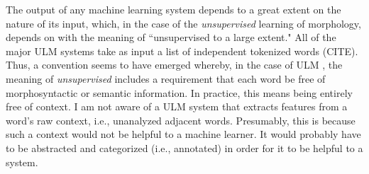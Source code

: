 The output of any machine learning system depends to 
a great extent on the nature of its input, which, in the case of the 
\emph{unsupervised} learning of morphology, 
depends on with the meaning of ``unsupervised to a large extent." 
All of the major \ac{ULM}  
systems take as input a list of independent tokenized words (CITE).
Thus, a convention seems to have emerged whereby, in the 
case of \ac{ULM} , the meaning of \emph{unsupervised} includes a
requirement that each word be free of morphosyntactic 
or semantic information. In practice,
this means being entirely free of context. I am 
not aware of a \ac{ULM}  system that extracts features from a word's raw context, i.e.,
unanalyzed adjacent words. Presumably, this is because 
such a context would not be helpful to a machine learner. 
It would probably have to be abstracted and categorized 
(i.e., annotated) in order
for it to be helpful to a system. 


